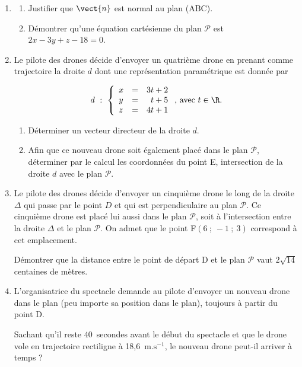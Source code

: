 \begin{enumerate}[resume]
	\item 
	\begin{enumerate}
		\item Justifier que $\vect{n}$ est normal au plan (ABC).
		\item Démontrer qu'une équation cartésienne du plan $\mathcal{P}$ est $2x - 3y + z - 18 = 0$.
	\end{enumerate}
	\item Le pilote des drones décide d'envoyer un quatrième drone en prenant comme trajectoire la droite $d$ dont une représentation paramétrique est donnée par 

\[ d~:~\left\{\begin{array}{l c l}
x&=&3t+2\\y&=&\phantom{3}t+5\\z&=&4t+1\end{array}\right.\text{, avec } t \in \R. \]
	\begin{enumerate}
		\item Déterminer un vecteur directeur de la droite $d$.
		\item Afin que ce nouveau drone soit également placé dans le plan $\mathcal{P}$, déterminer par le calcul les coordonnées du point E, intersection de la droite $d$ avec le plan $\mathcal{P}$.
	\end{enumerate}
	\item Le pilote des drones décide d'envoyer un cinquième drone le long de la droite $\Delta$ qui passe par le point $D$ et qui est perpendiculaire au plan $\mathcal{P}$. Ce cinquième drone est placé lui aussi dans le plan $\mathcal{P}$, soit à l'intersection entre la droite $\Delta$ et le plan $\mathcal{P}$. On admet que le point F$(6~;~-1~;~3)$ correspond à cet emplacement.
	
Démontrer que la distance entre le point de départ D et le plan $\mathcal{P}$ vaut $2\sqrt{14}$ centaines de mètres.
	\item L'organisatrice du spectacle demande au pilote d'envoyer un nouveau drone dans le plan (peu importe sa position dans le plan), toujours à partir du point D.
	
Sachant qu'il reste $40$~secondes avant le début du spectacle et que le drone vole en trajectoire rectiligne à 18,6~$\text{m.s}^{-1}$, le nouveau drone peut-il arriver à temps ?
\end{enumerate}
